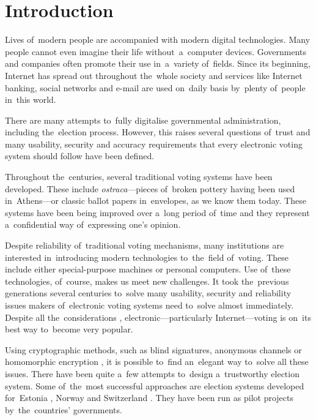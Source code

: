 \chapter*{Introduction}
Lives of~modern people are accompanied with modern digital technologies. Many people cannot even imagine their life without~a~computer devices. Governments and companies often promote their use in~a~variety of~fields. Since its beginning, Internet has spread out throughout the~whole society and services like Internet banking, social networks and e-mail are used on~daily basis by~plenty of~people in~this world. 

There are many attempts to~fully digitalise governmental administration, including the~election process. However, this raises several questions of~trust and many usability, security and accuracy requirements that every electronic voting system should follow have been defined.

Throughout the~centuries, several traditional voting systems have been developed. These include \emph{ostraca}—pieces of~broken pottery having been used in~Athens—or classic ballot papers in~envelopes, as we know them today. These systems have been being improved over a~long period of~time and they represent a~confidential way of~expressing one's opinion. 

Despite reliability of~traditional voting mechanisms, many institutions are interested in~introducing modern technologies to~the~field of~voting. These include either special-purpose machines or personal computers. Use of~these technologies, of~course, makes us meet new challenges. It took the~previous generations several centuries to~solve many usability, security and reliability issues makers of~electronic voting systems need to~solve almost immediately. Despite all the~considerations \cite{Rubin}, electronic—particularly Internet—voting is on~its best way to~become very popular.

Using cryptographic methods, such as blind signatures, anonymous channels or homomorphic encryption \cite{Haenni}, it is possible to~find an~elegant way to~solve all these issues. There have been quite a~few attempts to~design a~trustworthy election system. Some of~the~most successful approaches are election systems developed for~Estonia \cite{Maaten, Springall}, Norway \cite{Gjosteen2010, Gjosteen2012, Gjosteen2015} and Switzerland \cite{Swiss}. They have been run as pilot projects by~the~countries' governments.

